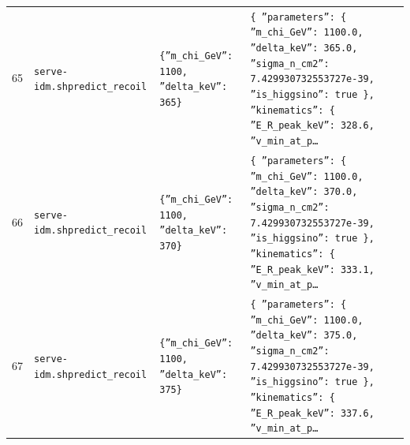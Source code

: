 \documentclass[11pt,a4paper]{article}
\begin{document}
\begin{longtable}{@{}p{}p{}p{}p{}@{}}
65 & \texttt{serve-idm.sh}\newline\texttt{predict\_\allowbreak{}recoil} & \texttt{\{''m\_\allowbreak{}chi\_\allowbreak{}GeV'':\allowbreak{} 1100,\allowbreak{} ''delta\_\allowbreak{}keV'':\allowbreak{} 365\}\allowbreak{}} & \texttt{\{   ''parameters'':\allowbreak{} \{     ''m\_\allowbreak{}chi\_\allowbreak{}GeV'':\allowbreak{} 1100.0,\allowbreak{}     ''delta\_\allowbreak{}keV'':\allowbreak{} 365.0,\allowbreak{}     ''sigma\_\allowbreak{}n\_\allowbreak{}cm2'':\allowbreak{} 7.429930732553727e-39,\allowbreak{}     ''is\_\allowbreak{}higgsino'':\allowbreak{} true   \}\allowbreak{},\allowbreak{}   ''kinematics'':\allowbreak{} \{     ''E\_\allowbreak{}R\_\allowbreak{}peak\_\allowbreak{}keV'':\allowbreak{} 328.6,\allowbreak{}     ''v\_\allowbreak{}min\_\allowbreak{}at\_\allowbreak{}p\ldots{}\allowbreak{}} \\
66 & \texttt{serve-idm.sh}\newline\texttt{predict\_\allowbreak{}recoil} & \texttt{\{''m\_\allowbreak{}chi\_\allowbreak{}GeV'':\allowbreak{} 1100,\allowbreak{} ''delta\_\allowbreak{}keV'':\allowbreak{} 370\}\allowbreak{}} & \texttt{\{   ''parameters'':\allowbreak{} \{     ''m\_\allowbreak{}chi\_\allowbreak{}GeV'':\allowbreak{} 1100.0,\allowbreak{}     ''delta\_\allowbreak{}keV'':\allowbreak{} 370.0,\allowbreak{}     ''sigma\_\allowbreak{}n\_\allowbreak{}cm2'':\allowbreak{} 7.429930732553727e-39,\allowbreak{}     ''is\_\allowbreak{}higgsino'':\allowbreak{} true   \}\allowbreak{},\allowbreak{}   ''kinematics'':\allowbreak{} \{     ''E\_\allowbreak{}R\_\allowbreak{}peak\_\allowbreak{}keV'':\allowbreak{} 333.1,\allowbreak{}     ''v\_\allowbreak{}min\_\allowbreak{}at\_\allowbreak{}p\ldots{}\allowbreak{}} \\
67 & \texttt{serve-idm.sh}\newline\texttt{predict\_\allowbreak{}recoil} & \texttt{\{''m\_\allowbreak{}chi\_\allowbreak{}GeV'':\allowbreak{} 1100,\allowbreak{} ''delta\_\allowbreak{}keV'':\allowbreak{} 375\}\allowbreak{}} & \texttt{\{   ''parameters'':\allowbreak{} \{     ''m\_\allowbreak{}chi\_\allowbreak{}GeV'':\allowbreak{} 1100.0,\allowbreak{}     ''delta\_\allowbreak{}keV'':\allowbreak{} 375.0,\allowbreak{}     ''sigma\_\allowbreak{}n\_\allowbreak{}cm2'':\allowbreak{} 7.429930732553727e-39,\allowbreak{}     ''is\_\allowbreak{}higgsino'':\allowbreak{} true   \}\allowbreak{},\allowbreak{}   ''kinematics'':\allowbreak{} \{     ''E\_\allowbreak{}R\_\allowbreak{}peak\_\allowbreak{}keV'':\allowbreak{} 337.6,\allowbreak{}     ''v\_\allowbreak{}min\_\allowbreak{}at\_\allowbreak{}p\ldots{}\allowbreak{}} \\

\end{longtable}
\end{document}
